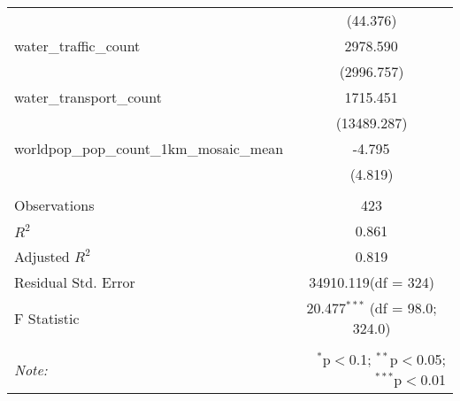 \begin{table}[!htbp]
\begin{tabular}{@{\extracolsep{5pt}}lc}
  & (44.376) \\
 water_traffic_count & 2978.590$^{}$ \\
  & (2996.757) \\
 water_transport_count & 1715.451$^{}$ \\
  & (13489.287) \\
 worldpop_pop_count_1km_mosaic_mean & -4.795$^{}$ \\
  & (4.819) \\
\hline \\[-1.8ex]
 Observations & 423 \\
 $R^2$ & 0.861 \\
 Adjusted $R^2$ & 0.819 \\
 Residual Std. Error & 34910.119(df = 324)  \\
 F Statistic & 20.477$^{***}$ (df = 98.0; 324.0) \\
\hline
\hline \\[-1.8ex]
\textit{Note:} & \multicolumn{1}{r}{$^{*}$p$<$0.1; $^{**}$p$<$0.05; $^{***}$p$<$0.01} \\
\end{tabular}
\end{table}